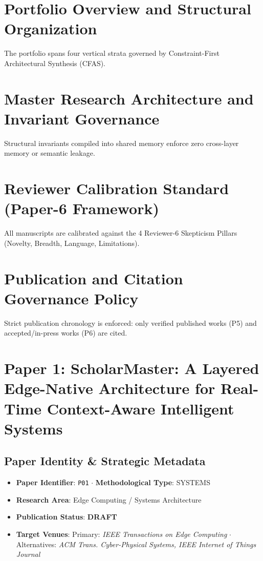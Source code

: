 \documentclass[11pt,a4paper]{article}
\begin{document}
\section{Portfolio Overview and Structural Organization}
The portfolio spans four vertical strata governed by Constraint-First Architectural Synthesis (CFAS).

\section{Master Research Architecture and Invariant Governance}
Structural invariants compiled into shared memory enforce zero cross-layer memory or semantic leakage.

\section{Reviewer Calibration Standard (Paper-6 Framework)}
All manuscripts are calibrated against the 4 Reviewer-6 Skepticism Pillars (Novelty, Breadth, Language, Limitations).

\section{Publication and Citation Governance Policy}
Strict publication chronology is enforced: only verified published works (P5) and accepted/in-press works (P6) are cited.


\section{Paper 1: ScholarMaster: A Layered Edge-Native Architecture for Real-Time Context-Aware Intelligent Systems}

\subsection*{Paper Identity \& Strategic Metadata}
\begin{itemize}[leftmargin=1.5em, itemsep=0.2em]
    \item \textbf{Paper Identifier}: \texttt{P01} $\cdot$ \textbf{Methodological Type}: SYSTEMS
    \item \textbf{Research Area}: Edge Computing / Systems Architecture
    \item \textbf{Publication Status}: \textbf{DRAFT}
    \item \textbf{Target Venues}: Primary: \textit{IEEE Transactions on Edge Computing} $\cdot$ Alternatives: \textit{ACM Trans. Cyber-Physical Systems, IEEE Internet of Things Journal}
\end{itemize}
\end{document}
